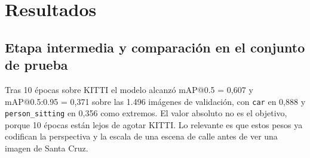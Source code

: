 \documentclass[10pt,a4paper]{article}
\begin{document}
\section{Resultados}
\subsection{Etapa intermedia y comparación en el conjunto de prueba}
Tras 10 épocas sobre KITTI el modelo alcanzó mAP@0.5 = 0{,}607 y mAP@0.5:0.95 = 0{,}371
sobre las 1{.}496 imágenes de validación, con \texttt{car} en 0{,}888 y
\texttt{person\_sitting} en 0{,}356 como extremos. El valor absoluto no es el objetivo,
porque 10 épocas están lejos de agotar KITTI. Lo relevante es que estos pesos ya codifican
la perspectiva y la escala de una escena de calle antes de ver una imagen de Santa Cruz.
\end{document}
